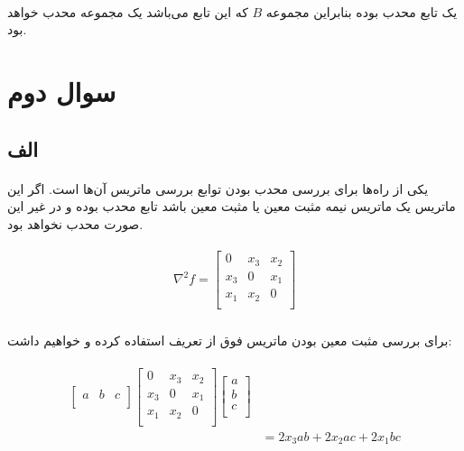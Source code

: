 \documentclass[paper=a4, fontsize=11pt]{article}
\numberwithin{equation}{section} %
\numberwithin{figure}{section} %
\numberwithin{table}{section} %
\begin{document}
\paragraph{}
یک تابع محدب بوده بنابراین مجموعه \(B\) که  این تابع می‌باشد یک مجموعه محدب خواهد بود.

\section{سوال دوم}
\subsection{الف}
\paragraph{}
یکی از راه‌ها برای بررسی محدب بودن توابع بررسی ماتریس  آن‌ها است.
اگر این ماتریس یک ماتریس نیمه مثبت معین یا مثبت معین باشد تابع محدب بوده و در غیر این صورت محدب نخواهد بود.

\begin{align}
\begin{split}
	\nabla^2f = \left[\begin{array}{ccc}
		0 & x_3 & x_2 \\
		x_3 & 0 & x_1 \\
		x_1 & x_2 & 0 \\
	\end{array}\right]
\end{split}
\end{align}

\paragraph{}
برای بررسی مثبت معین بودن ماتریس فوق از تعریف استفاده کرده و خواهیم داشت:

\begin{align}
\begin{split}
	\left[\begin{array}{ccc}
		a & b & c \\
	\end{array}\right]
	\left[\begin{array}{ccc}
		0 & x_3 & x_2 \\
		x_3 & 0 & x_1 \\
		x_1 & x_2 & 0 \\
	\end{array}\right]
	\left[\begin{array}{c}
		a \\
		b \\
		c \\
	\end{array}\right]
	\\
	&= 2x_3ab + 2x_2ac + 2x_1bc
\end{split}
\end{align}
\end{document}
